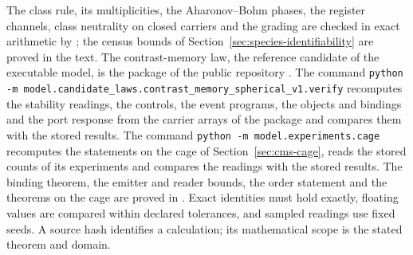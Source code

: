 \documentclass[11pt]{article}
\begin{document}
The class rule, its multiplicities, the Aharonov--Bohm phases, the register channels,
class neutrality on closed carriers and the grading are checked in exact arithmetic by
; the census bounds of
Section~\ref{sec:species-identifiability} are proved in the text. The contrast-memory law,
the reference candidate of the executable model, is the package  of the public repository
\cite{ophrepo}. The command \texttt{python -m model.candidate\_laws.contrast\_memory\_spherical\_v1.verify} recomputes the
stability readings, the controls, the event programs, the objects and bindings and the port
response from the carrier arrays of the package and compares them with the stored results.
The command \texttt{python -m model.experiments.cage} recomputes the statements on the
cage of Section~\ref{sec:cms-cage}, reads the stored counts of its experiments and compares
the readings with the stored results. The binding theorem, the emitter and reader bounds,
the order statement and the theorems on the cage are proved in
\cite{ophmodel}. Exact identities must hold exactly, floating values are compared within
declared tolerances, and sampled readings use fixed seeds. A source hash identifies a
calculation; its mathematical scope is the stated theorem and domain.
\end{document}
